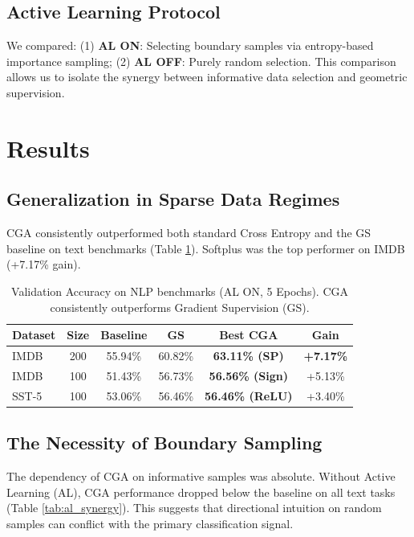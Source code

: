 \documentclass[sigconf,anonymous]{aamas}
\begin{document}
\subsection{Active Learning Protocol}
We compared: (1) \textbf{AL ON}: Selecting boundary samples via entropy-based importance sampling; (2) \textbf{AL OFF}: Purely random selection. This comparison allows us to isolate the synergy between informative data selection and geometric supervision.

\section{Results}
\label{sec:results}

\subsection{Generalization in Sparse Data Regimes}
CGA consistently outperformed both standard Cross Entropy and the GS baseline on text benchmarks (Table \ref{tab:nlp_results}). Softplus was the top performer on IMDB (+7.17\% gain).

\begin{table}[h]
\centering
\caption{Validation Accuracy on NLP benchmarks (AL ON, 5 Epochs). CGA consistently outperforms Gradient Supervision (GS).}
\label{tab:nlp_results}
\begin{tabular}{@{}lccccc@{}}
\toprule
\textbf{Dataset} & \textbf{Size} & \textbf{Baseline} & \textbf{GS \cite{teney2020learning}} & \textbf{Best CGA} & \textbf{Gain} \\ \midrule
IMDB & 200 & 55.94\% & 60.82\% & \textbf{63.11\% (SP)} & \textbf{+7.17\%}
\\IMDB & 100 & 51.43\% & 56.73\% & \textbf{56.56\% (Sign)} & +5.13\%
\\SST-5 & 100 & 53.06\% & 56.46\% & \textbf{56.46\% (ReLU)} & +3.40\% \\ \bottomrule
\end{tabular}
\end{table}

\subsection{The Necessity of Boundary Sampling}
The dependency of CGA on informative samples was absolute. Without Active Learning (AL), CGA performance dropped below the baseline on all text tasks (Table \ref{tab:al_synergy}). This suggests that directional intuition on random samples can conflict with the primary classification signal.
\end{document}
